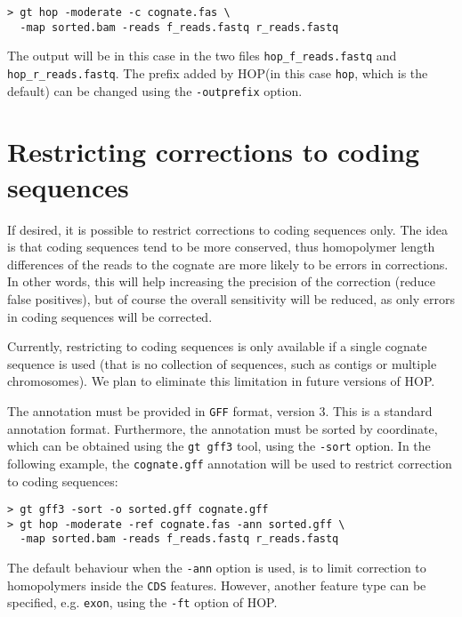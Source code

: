 \documentclass[12pt,titlepage]{article}
\newcommand{\Hop}{{HOP}\xspace}
\begin{document}
\begin{footnotesize}
\begin{verbatim}
> gt hop -moderate -c cognate.fas \
  -map sorted.bam -reads f_reads.fastq r_reads.fastq
\end{verbatim}
\end{footnotesize}

The output will be in this case in the two files
\texttt{hop\_f\_reads.fastq} and \texttt{hop\_r\_reads.fastq}.
The prefix added by \Hop (in this case \texttt{hop},
which is the default) can be changed using the \texttt{-outprefix}
option.

\section{Restricting corrections to coding sequences}

If desired, it is possible to restrict corrections to coding
sequences only. The idea is that coding sequences tend to be
more conserved, thus homopolymer length differences of the
reads to the cognate are more likely to be errors in
corrections. In other words, this will help increasing the
precision of the correction (reduce false positives),
but of course the overall sensitivity will be reduced, as
only errors in coding sequences will be corrected.

Currently, restricting to coding sequences is only
available if a single cognate sequence is used (that
is no collection of sequences, such as contigs or multiple
chromosomes). We plan to eliminate this limitation in future
versions of \Hop.

The annotation must be provided in \texttt{GFF} format, version 3.
This is a standard annotation format. Furthermore, the
annotation must be sorted by coordinate, which can be obtained
using the \texttt{gt gff3} tool, using the \texttt{-sort}
option. In the following example, the \texttt{cognate.gff} annotation
will be used to restrict correction to coding sequences:

\begin{footnotesize}
\begin{verbatim}
> gt gff3 -sort -o sorted.gff cognate.gff
> gt hop -moderate -ref cognate.fas -ann sorted.gff \
  -map sorted.bam -reads f_reads.fastq r_reads.fastq
\end{verbatim}
\end{footnotesize}

The default behaviour when the \texttt{-ann} option is used,
is to limit correction to homopolymers inside the \texttt{CDS}
features. However, another feature type can be specified,
e.g. \texttt{exon}, using the \texttt{-ft} option of \Hop.
\end{document}
